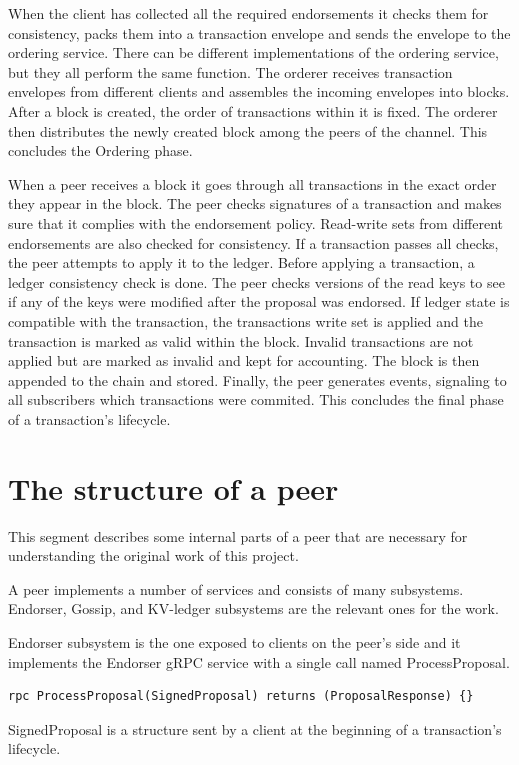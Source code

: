 When the client has collected all the required endorsements it checks them for consistency, packs them into a transaction envelope and sends the envelope to the ordering service. There can be different implementations of the ordering service, but they all perform the same function. The orderer receives transaction envelopes from different clients and assembles the incoming envelopes into blocks. After a  block is created, the order of transactions within it is fixed. The orderer then distributes the newly created block among the peers of the channel. This concludes the Ordering phase.

When a peer receives a block it goes through all transactions in the exact order they appear in the block. The peer checks signatures of a transaction and makes sure that it complies with the endorsement policy. Read-write sets from different endorsements are also checked for consistency. If a transaction passes all checks, the peer attempts to apply it to the ledger. Before applying a transaction, a ledger consistency check is done. The peer checks versions of the read keys to see if any of the keys were modified after the proposal was endorsed. If ledger state is compatible with the transaction, the transactions write set is applied and the transaction is marked as valid within the block. Invalid transactions are not applied but are marked as invalid and kept for accounting. The block is then appended to the chain and stored. Finally, the peer generates events, signaling to all subscribers which transactions were commited. This concludes the final phase of a transaction's lifecycle.

\section{The structure of a peer}
\label{sec:back-peer}
This segment describes some internal parts of a peer that are necessary for understanding the original work of this project.

A peer implements a number of services and consists of many subsystems. Endorser, Gossip, and KV-ledger subsystems are the relevant ones for the work.

Endorser subsystem is the one exposed to clients on the peer's side and it implements the Endorser gRPC service with a single call named ProcessProposal.
\begin{lstlisting}
rpc ProcessProposal(SignedProposal) returns (ProposalResponse) {}
\end{lstlisting}
SignedProposal is a structure sent by a client at the beginning of a transaction's lifecycle.

